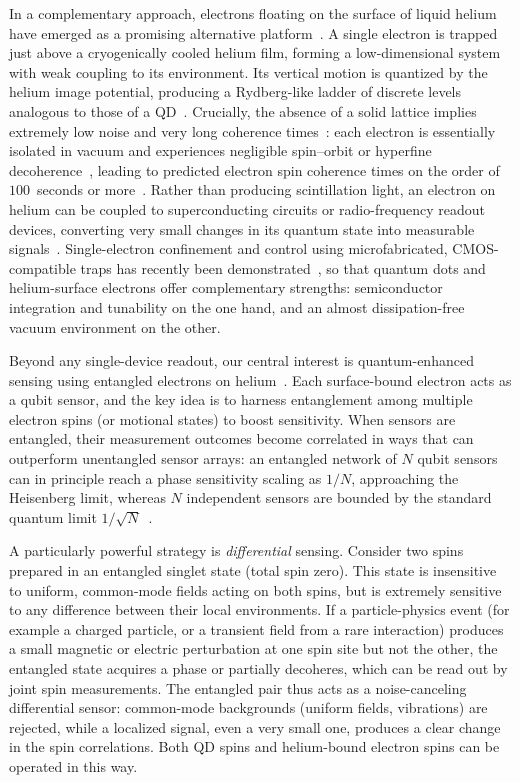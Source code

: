 \documentclass[fleqn,10pt]{wlscirep}
\begin{document}
In a complementary approach, electrons floating on the surface of liquid helium have emerged as a promising alternative platform~\cite{dykman2025}. A single electron is trapped just above a cryogenically cooled helium film, forming a low-dimensional system with weak coupling to its environment. Its vertical motion is quantized by the helium image potential, producing a Rydberg-like ladder of discrete levels analogous to those of a QD~\cite{monarkha2013two}. Crucially, the absence of a solid lattice implies extremely low noise and very long coherence times~\cite{platzmanQuantumComputingElectrons1999,lyonSpinbasedQuantumComputing2006}: each electron is essentially isolated in vacuum and experiences negligible spin--orbit or hyperfine decoherence~\cite{schusterProposalManipulatingDetecting2010}, leading to predicted electron spin coherence times on the order of $100$~seconds or more~\cite{lyonSpinbasedQuantumComputing2006}. Rather than producing scintillation light, an electron on helium can be coupled to superconducting circuits or radio-frequency readout devices, converting very small changes in its quantum state into measurable signals~\cite{castoria2025,koolstra2026strong}. Single-electron confinement and control using microfabricated, CMOS-compatible traps has recently been demonstrated~\cite{bradburyEfficientClockedElectron2011,castoria2025selective}, so that quantum dots and helium-surface electrons offer complementary strengths: semiconductor integration and tunability on the one hand, and an almost dissipation-free vacuum environment on the other.

Beyond any single-device readout, our central interest is quantum-enhanced sensing using entangled electrons on helium~\cite{beysengulov2024,leinonen2025}. Each surface-bound electron acts as a qubit sensor, and the key idea is to harness entanglement among multiple electron spins (or motional states) to boost sensitivity. When sensors are entangled, their measurement outcomes become correlated in ways that can outperform unentangled sensor arrays: an entangled network of $N$ qubit sensors can in principle reach a phase sensitivity scaling as $1/N$, approaching the Heisenberg limit, whereas $N$ independent sensors are bounded by the standard quantum limit $1/\sqrt{N}$~\cite{giovannetti2004quantum,giovannetti2006quantum,degen2017quantum}.

A particularly powerful strategy is {\it differential} sensing. Consider two spins prepared in an entangled singlet state (total spin zero). This state is insensitive to uniform, common-mode fields acting on both spins, but is extremely sensitive to any difference between their local environments. If a particle-physics event (for example a charged particle, or a transient field from a rare interaction) produces a small magnetic or electric perturbation at one spin site but not the other, the entangled state acquires a phase or partially decoheres, which can be read out by joint spin measurements. The entangled pair thus acts as a noise-canceling differential sensor: common-mode backgrounds (uniform fields, vibrations) are rejected, while a localized signal, even a very small one, produces a clear change in the spin correlations. Both QD spins and helium-bound electron spins can be operated in this way.
\end{document}
